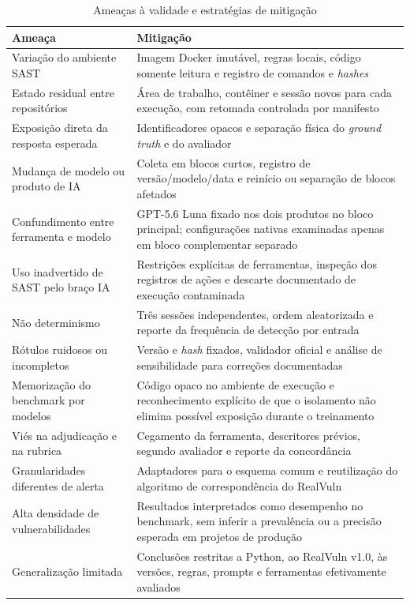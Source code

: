 \begin{table}[htb]
\ABNTEXfontereduzida
\caption{\label{tab:ameacas-validade}Ameaças à validade e estratégias de mitigação}
\centering
\begin{tabularx}{\textwidth}{|X|X|}
\hline
\textbf{Ameaça} & \textbf{Mitigação} \\
\hline
Variação do ambiente SAST & Imagem Docker imutável, regras locais, código somente leitura e registro de comandos e \textit{hashes} \\
\hline
Estado residual entre repositórios & Área de trabalho, contêiner e sessão novos para cada execução, com retomada controlada por manifesto \\
\hline
Exposição direta da resposta esperada & Identificadores opacos e separação física do \textit{ground truth} e do avaliador \\
\hline
Mudança de modelo ou produto de IA & Coleta em blocos curtos, registro de versão/modelo/data e reinício ou separação de blocos afetados \\
\hline
Confundimento entre ferramenta e modelo & GPT-5.6 Luna fixado nos dois produtos no bloco principal; configurações nativas examinadas apenas em bloco complementar separado \\
\hline
Uso inadvertido de SAST pelo braço IA & Restrições explícitas de ferramentas, inspeção dos registros de ações e descarte documentado de execução contaminada \\
\hline
Não determinismo & Três sessões independentes, ordem aleatorizada e reporte da frequência de detecção por entrada \\
\hline
Rótulos ruidosos ou incompletos & Versão e \textit{hash} fixados, validador oficial e análise de sensibilidade para correções documentadas \\
\hline
Memorização do benchmark por modelos & Código opaco no ambiente de execução e reconhecimento explícito de que o isolamento não elimina possível exposição durante o treinamento \\
\hline
Viés na adjudicação e na rubrica & Cegamento da ferramenta, descritores prévios, segundo avaliador e reporte da concordância \\
\hline
Granularidades diferentes de alerta & Adaptadores para o esquema comum e reutilização do algoritmo de correspondência do RealVuln \\
\hline
Alta densidade de vulnerabilidades & Resultados interpretados como desempenho no benchmark, sem inferir a prevalência ou a precisão esperada em projetos de produção \\
\hline
Generalização limitada & Conclusões restritas a Python, ao RealVuln v1.0, às versões, regras, prompts e ferramentas efetivamente avaliados \\
\hline
\end{tabularx}
\end{table}

